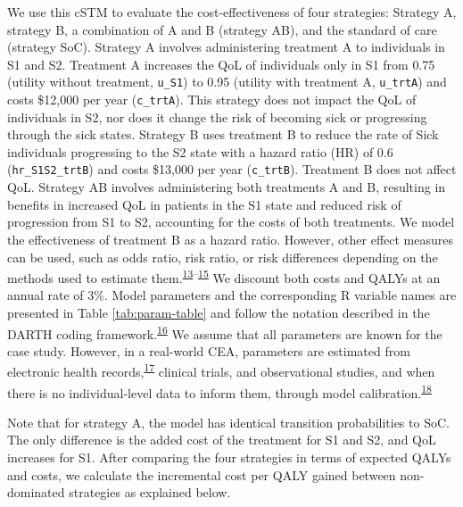 \documentclass[
]{article}
\begin{document}
We use this cSTM to evaluate the cost-effectiveness of four strategies: Strategy A, strategy B, a combination of A and B (strategy AB), and the standard of care (strategy SoC). Strategy A involves administering treatment A to individuals in S1 and S2. Treatment A increases the QoL of individuals only in S1 from 0.75 (utility without treatment, \texttt{u\_S1}) to 0.95 (utility with treatment A, \texttt{u\_trtA}) and costs \$12,000 per year (\texttt{c\_trtA}). This strategy does not impact the QoL of individuals in S2, nor does it change the risk of becoming sick or progressing through the sick states. Strategy B uses treatment B to reduce the rate of Sick individuals progressing to the S2 state with a hazard ratio (HR) of 0.6 (\texttt{hr\_S1S2\_trtB}) and costs \$13,000 per year (\texttt{c\_trtB}). Treatment B does not affect QoL. Strategy AB involves administering both treatments A and B, resulting in benefits in increased QoL in patients in the S1 state and reduced risk of progression from S1 to S2, accounting for the costs of both treatments. We model the effectiveness of treatment B as a hazard ratio. However, other effect measures can be used, such as odds ratio, risk ratio, or risk differences depending on the methods used to estimate them.\textsuperscript{\protect\hyperlink{ref-Kuntz2001}{13}--\protect\hyperlink{ref-Gidwani2020}{15}} We discount both costs and QALYs at an annual rate of 3\%. Model parameters and the corresponding R variable names are presented in Table \ref{tab:param-table} and follow the notation described in the DARTH coding framework.\textsuperscript{\protect\hyperlink{ref-Alarid-Escudero2019e}{16}} We assume that all parameters are known for the case study. However, in a real-world CEA, parameters are estimated from electronic health records,\textsuperscript{\protect\hyperlink{ref-Rodriguez2021}{17}} clinical trials, and observational studies, and when there is no individual-level data to inform them, through model calibration.\textsuperscript{\protect\hyperlink{ref-Welton2005}{18}}

Note that for strategy A, the model has identical transition probabilities to SoC. The only difference is the added cost of the treatment for S1 and S2, and QoL increases for S1. After comparing the four strategies in terms of expected QALYs and costs, we calculate the incremental cost per QALY gained between non-dominated strategies as explained below.
\end{document}
